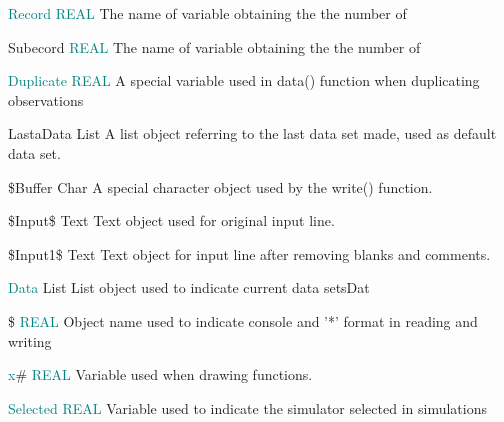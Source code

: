 { 
\noindent \textcolor{teal}{Record} \tabto{25mm }   \textcolor{teal}{REAL}  \tabto{45mm }   The name of variable obtaining the the number of 
 
 
\noindent Subecord \tabto{25mm }   \textcolor{teal}{REAL}  \tabto{45mm }   The name of variable obtaining the the number of 
 
 
\noindent \textcolor{teal}{Duplicate} \tabto{25mm }   \textcolor{teal}{REAL} \tabto{45mm }   A special variable used in \textcolor{VioletRed}{data}() function when duplicating observations 
 
 
\noindent LastaData  \tabto{25mm }  List \tabto{45mm }  	A list object referring to the last data set made, used as default data set. 
 
 
\noindent \$Buffer \tabto{25mm }  Char \tabto{45mm }   A special character object used by the \textcolor{VioletRed}{write}() function. 
 
 
\noindent \$Input\$ \tabto{25mm }   Text  \tabto{45mm }   Text object used for original input line. 
 
\$Input1\$  \tabto{25mm }  Text \tabto{45mm }   Text object for input line after removing blanks and comments. 
 
 
\noindent \textcolor{teal}{Data}  \tabto{25mm }  List \tabto{45mm }    List object used to indicate current data setsDat 
 
 
 
 
 
 
 
 
 
 
 
 
 
 
 
 
 
 
 
 
 
 
 
 
 
 
 
 
 
 
 
 
\noindent \$ \tabto{25mm }  \textcolor{teal}{REAL} \tabto{45mm }   Object name used to indicate console and '*' format in reading and writing 
 
 
\noindent \textcolor{teal}{x}\# \tabto{25mm }  \textcolor{teal}{REAL} \tabto{45mm }   Variable used when drawing functions. 
 
\noindent \textcolor{teal}{Selected} \tabto{25mm }   \textcolor{teal}{REAL}  \tabto{45mm }  Variable used to indicate the simulator selected in simulations 
 
}
